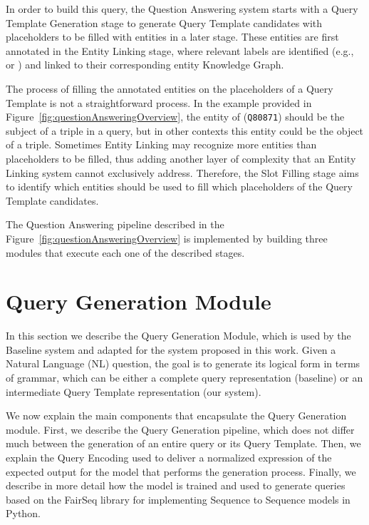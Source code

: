 In order to build this \SPARQL{} query, the Question Answering system starts with 
a Query Template Generation stage to generate \SPARQL{} Query Template candidates with 
placeholders to be filled with entities in a later stage. These entities are first annotated 
in the Entity Linking stage, where relevant labels are identified (e.g.,  or ) and linked to their corresponding entity Knowledge Graph. 

The process of filling the annotated entities on the placeholders of a Query Template is not a 
straightforward process. In the example provided in Figure~\ref{fig:questionAnsweringOverview},
the entity of  (\texttt{Q80871}) should be the subject 
of a triple in a \SPARQL query, but in other contexts this entity could be the object of a triple. 
Sometimes Entity Linking may recognize more entities than placeholders to be filled, 
thus adding another layer of complexity that an Entity Linking system cannot exclusively address.
Therefore, the Slot Filling stage aims to identify which entities should be used to 
fill which placeholders of the Query Template candidates. 

The Question Answering pipeline described in the Figure~\ref{fig:questionAnsweringOverview} 
is implemented by building three modules that execute each one of the described stages. 

\section{Query Generation Module}
\label{cap3:system/queryGenModule}
In this section we describe the Query Generation Module, which is used by the Baseline system 
and adapted for the system proposed in this work. Given a Natural Language (NL) question, the 
goal is to generate its logical form in terms of \SPARQL{} grammar, which can be either a 
complete \SPARQL{} query representation (baseline) or an intermediate Query Template 
representation (our system).

We now explain the main components that encapsulate the Query Generation module. First, we 
describe the Query Generation pipeline, which does not differ much between the generation of 
an entire \SPARQL{} query or its Query Template. Then, we explain the Query Encoding used to 
deliver a normalized expression of the expected output for the model that performs the 
generation process. Finally, we describe in more detail how the model is trained and used to 
generate queries based on the FairSeq library for implementing Sequence to Sequence models in 
Python.

